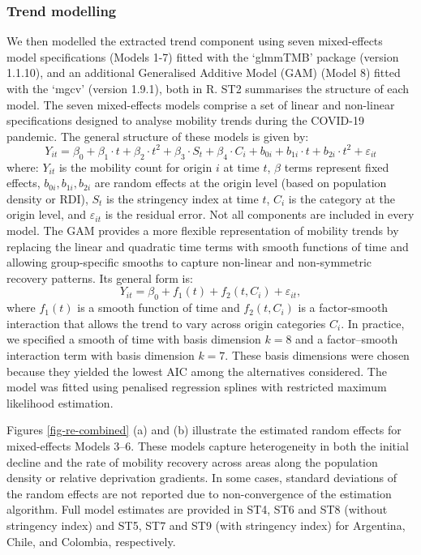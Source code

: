 \documentclass[fleqn,10pt]{wlscirep}
\begin{document}
\subsubsection*{Trend modelling}

We then modelled the extracted trend component using seven mixed-effects model specifications (Models 1-7) fitted with the `glmmTMB' package (version 1.1.10), and an additional Generalised Additive Model (GAM) (Model 8) fitted with the `mgcv' (version 1.9.1), both in R. ST2 summarises the structure of each model. The seven mixed-effects models comprise a set of linear and non-linear specifications designed to analyse mobility trends during the COVID-19 pandemic. The general structure of these models is given by:
\begin{equation}\label{model-trend}
Y_{it} = \beta_0 + \beta_1 \cdot {t} + \beta_2 \cdot {t}^2 + \beta_3 \cdot S_{t} + \beta_4 \cdot C_i + b_{0i} + b_{1i} \cdot t + b_{2i} \cdot t^2 + \varepsilon_{it}
\end{equation}
where: $Y_{it}$ is the mobility count for origin $i$ at time $t$, $\beta$ terms represent fixed effects, $b_{0i}, b_{1i}, b_{2i}$ are random effects at the origin level (based on population density or RDI), $S_t$ is the stringency index at time $t$, $C_i$ is the category at the origin level, and $\varepsilon_{it}$ is the residual error. Not all components are included in every model. The GAM provides a more flexible representation of mobility trends by replacing the linear and quadratic time terms with smooth functions of time and allowing group-specific smooths to capture non-linear and non-symmetric recovery patterns. Its general form is:
\begin{equation}\label{model-gam}
Y_{it} = \beta_0 + f_1(t) + f_2(t, C_i) + \varepsilon_{it},
\end{equation}
where $f_1(t)$ is a smooth function of time and $f_2(t, C_i)$ is a factor-smooth interaction that allows the trend to vary across origin categories $C_i$. In practice, we specified a smooth of time with basis dimension $k = 8$ and a factor--smooth interaction term with basis dimension $k = 7$. These basis dimensions were chosen because they yielded the lowest AIC among the alternatives considered. The model was fitted using penalised regression splines with restricted maximum likelihood estimation.

Figures \ref{fig-re-combined} (a) and (b) illustrate the estimated random effects for mixed-effects Models 3--6. These models capture heterogeneity in both the initial decline and the rate of mobility recovery across areas along the population density or relative deprivation gradients. In some cases, standard deviations of the random effects are not reported due to non-convergence of the estimation algorithm. Full model estimates are provided in ST4, ST6 and ST8 (without stringency index) and ST5, ST7 and ST9 (with stringency index) for Argentina, Chile, and Colombia, respectively.
\end{document}
